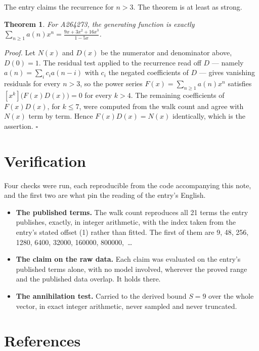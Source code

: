 \documentclass[11pt]{article}
\newtheorem{theorem}{Theorem}
\theoremstyle{definition}
\begin{document}
The entry claims the recurrence for $n > 3$. The theorem is at least as strong.

\begin{theorem} For A264273, the generating function is exactly $\sum_{n\ge 1} a(n)x^n = \frac{9x + 3x^{2} + 16x^{3}}{1 - 5x}$.\end{theorem}

{\itshape Proof.} Let $N(x)$ and $D(x)$ be the numerator and denominator above, $D(0)=1$. The residual test applied to the recurrence read off $D$ --- namely $a(n) = \sum_i c_i a(n-i)$ with $c_i$ the negated coefficients of $D$ --- gives vanishing residuals for every $n > 3$, so the power series $F(x)=\sum_{n\ge 1}a(n)x^n$ satisfies $[x^k]\bigl(F(x)D(x)\bigr) = 0$ for every $k > 4$. The remaining coefficients of $F(x)D(x)$, for $k \le 7$, were computed from the walk count and agree with $N(x)$ term by term. Hence $F(x)D(x) = N(x)$ identically, which is the assertion. $\square$

\section{Verification}

Four checks were run, each reproducible from the code accompanying this note, and the first two are what pin the reading of the entry's English.

\begin{itemize}

\item {\bfseries The published terms.} The walk count reproduces all 21 terms the entry publishes, exactly, in integer arithmetic, with the index taken from the entry's stated offset (1) rather than fitted. The first of them are 9, 48, 256, 1280, 6400, 32000, 160000, 800000,~\dots

\item {\bfseries The claim on the raw data.} Each claim was evaluated on the entry's published terms alone, with no model involved, wherever the proved range and the published data overlap. It holds there.

\item {\bfseries The annihilation test.} Carried to the derived bound $S = 9$ over the whole vector, in exact integer arithmetic, never sampled and never truncated.

\end{itemize}

\section{References}
\end{document}
